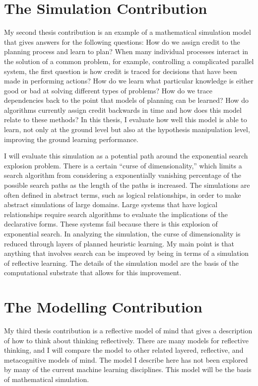 \section{The Simulation Contribution}

My second thesis contribution is an example of a mathematical
simulation model that gives answers for the following questions: How
do we assign credit to the planning process and learn to plan?  When
many individual processes interact in the solution of a common
problem, for example, controlling a complicated parallel system, the
first question is how credit is traced for decisions that have been
made in performing actions?  How do we learn what particular knowledge
is either good or bad at solving different types of problems?  How do
we trace dependencies back to the point that models of planning can be
learned?  How do algorithms currently assign credit backwards in time
and how does this model relate to these methods?  In this thesis, I
evaluate how well this model is able to learn, not only at the ground
level but also at the hypothesis manipulation level, improving the
ground learning performance.

I will evaluate this simulation as a potential path around the
exponential search explosion problem.  There is a certain ``curse of
dimensionality,'' which limits a search algorithm from considering a
exponentially vanishing percentage of the possible search paths as the
length of the paths is increased.  The simulations are often defined
in abstract terms, such as logical relationships, in order to make
abstract simulations of large domains.  Large systems that have
logical relationships require search algorithms to evaluate the
implications of the declarative forms.  These systems fail because
there is this explosion of exponential search.  In analyzing the
simulation, the curse of dimensionality is reduced through layers of
planned heuristic learning.  My main point is that anything that
involves search can be improved by being in terms of a simulation of
reflective learning.  The details of the simulation model are the
basis of the computational substrate that allows for this improvement.

\section{The Modelling Contribution}

My third thesis contribution is a reflective model of mind that gives
a description of how to think about thinking reflectively.  There are
many models for reflective thinking, and I will compare the model to
other related layered, reflective, and metacognitive models of mind.
The model I describe here has not been explored by many of the current
machine learning disciplines.  This model will be the basis of
mathematical simulation.

